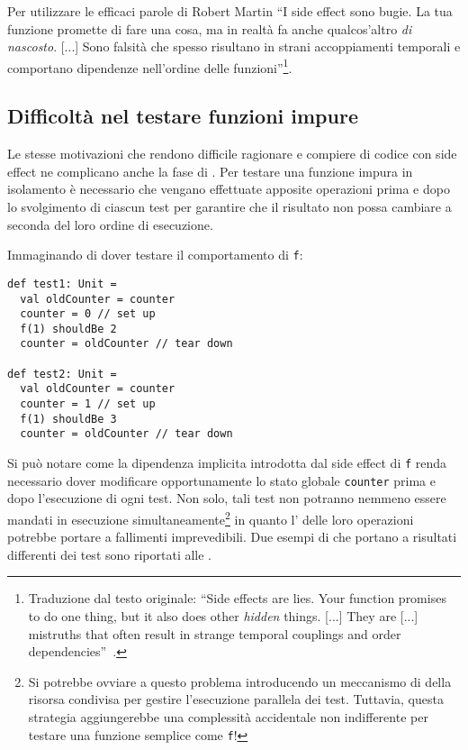 Per utilizzare le efficaci parole di Robert Martin ``I side effect sono bugie. La tua funzione promette di fare una cosa, ma in realtà fa anche qualcos'altro \emph{di nascosto}. [...] Sono falsità che spesso risultano in strani accoppiamenti temporali e comportano dipendenze nell'ordine delle funzioni''\footnote{Traduzione dal testo originale: ``Side effects are lies. Your function promises to do one thing, but it also does other \emph{hidden} things. [...] They are [...] mistruths that often result in strange temporal couplings and order dependencies''~\cite[p.~44]{cit:clean-code-a-handbook-of-agile-software-craftsmanship}.}.

\subsection*{Difficoltà nel testare funzioni impure}
\label{subsection:difficolta-nel-testare-funzioni-impure}
Le stesse motivazioni che rendono difficile ragionare e compiere  di codice con side effect ne complicano anche la fase di .
Per testare una funzione impura in isolamento è necessario che vengano effettuate apposite operazioni prima e dopo lo svolgimento di ciascun test per garantire che il risultato non possa cambiare a seconda del loro ordine di esecuzione.

Immaginando di dover testare il comportamento di \lstinline{f}:
\begin{lstlisting}[language=scala3]
def test1: Unit =
  val oldCounter = counter
  counter = 0 // set up
  f(1) shouldBe 2
  counter = oldCounter // tear down

def test2: Unit =
  val oldCounter = counter
  counter = 1 // set up
  f(1) shouldBe 3
  counter = oldCounter // tear down
\end{lstlisting}
Si può notare come la dipendenza implicita introdotta dal side effect di \lstinline{f} renda necessario dover modificare opportunamente lo stato globale \lstinline{counter} prima e dopo l'esecuzione di ogni test.
Non solo, tali test non potranno nemmeno essere mandati in esecuzione simultaneamente\footnote{Si potrebbe ovviare a questo problema introducendo un meccanismo di  della risorsa condivisa per gestire l'esecuzione parallela dei test. Tuttavia, questa strategia aggiungerebbe una complessità accidentale non indifferente per testare una funzione semplice come \lstinline{f}!} in quanto l' delle loro operazioni potrebbe portare a fallimenti imprevedibili.
Due esempi di  che portano a risultati differenti dei test sono riportati alle .

